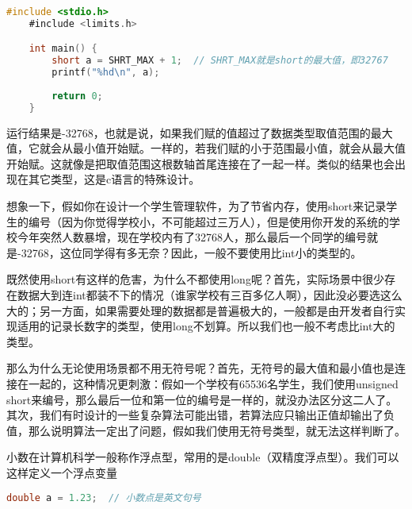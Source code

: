 \begin{lstlisting}[language=C]
    #include <stdio.h>
    #include <limits.h>

    int main() {
        short a = SHRT_MAX + 1;  // SHRT_MAX就是short的最大值，即32767
        printf("%hd\n", a);
        
        return 0;
    } 
\end{lstlisting}

运行结果是-32768，也就是说，如果我们赋的值超过了数据类型取值范围的最大值，它就会从最小值开始赋。一样的，若我们赋的小于范围最小值，就会从最大值开始赋。这就像是把取值范围这根数轴首尾连接在了一起一样。类似的结果也会出现在其它类型，这是c语言的特殊设计。

想象一下，假如你在设计一个学生管理软件，为了节省内存，使用short来记录学生的编号（因为你觉得学校小，不可能超过三万人），但是使用你开发的系统的学校今年突然人数暴增，现在学校内有了32768人，那么最后一个同学的编号就是-32768，这位同学得有多无奈？因此，一般不要使用比int小的类型的。

既然使用short有这样的危害，为什么不都使用long呢？首先，实际场景中很少存在数据大到连int都装不下的情况（谁家学校有三百多亿人啊），因此没必要选这么大的；另一方面，如果需要处理的数据都是普遍极大的，一般都是由开发者自行实现适用的记录长数字的类型，使用long不划算。所以我们也一般不考虑比int大的类型。

那么为什么无论使用场景都不用无符号呢？首先，无符号的最大值和最小值也是连接在一起的，这种情况更刺激：假如一个学校有65536名学生，我们使用unsigned short来编号，那么最后一位和第一位的编号是一样的，就没办法区分这二人了。其次，我们有时设计的一些复杂算法可能出错，若算法应只输出正值却输出了负值，那么说明算法一定出了问题，假如我们使用无符号类型，就无法这样判断了。

小数在计算机科学一般称作浮点型，常用的是double（双精度浮点型）。我们可以这样定义一个浮点变量

\begin{lstlisting}[language=C]
    double a = 1.23;  // 小数点是英文句号
\end{lstlisting}


